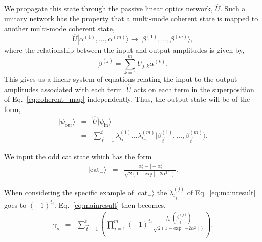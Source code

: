 \documentclass[aps,pra,singlecolumn,amsmath,amssymb,nofootinbib,superscriptaddress]{revtex4}
\newcommand{\ket}[1]{|#1\rangle}
\begin{document}
We propagate this state through the passive linear optics network, $\hat{U}$. Such a unitary network has the property that a multi-mode coherent state is mapped to another multi-mode coherent state,
\begin{equation} \label{eq:coherent_map}
\hat{U} \ket{\alpha^{(1)},\dots,\alpha^{(m)}} \to \ket{\beta^{(1)},\dots,\beta^{(m)}},
\end{equation}
where the relationship between the input and output amplitudes is given by,
\begin{equation} \label{eq:coherent_map_relation}
\beta^{(j)} = \sum_{k=1}^m U_{j,k} \alpha^{(k)}.
\end{equation}
This gives us a linear system of equations relating the input to the output amplitudes associated with each term. $\hat{U}$ acts on each term in the superposition of Eq.~\ref{eq:coherent_map} independently. Thus, the output state will be of the form,
\begin{eqnarray} \label{eq:psi_out}
\ket{\psi_\mathrm{out}} &=& \hat{U} \ket{\psi_\mathrm{in}} \nonumber \\
&=& \sum_{\vec{t}=1}^{t} \lambda_{t_1}^{(1)}\dots \lambda_{t_m}^{(m)} \ket{\beta_{\vec{t}}^{(1)}, \dots, \beta_{\vec{t}}^{(m)}}.
\end{eqnarray}

We input the odd cat state which has the form 
\begin{eqnarray}
\ket{\mathrm{cat}_-} &=& \frac{\ket{\alpha}-\ket{-\alpha}}{\sqrt{2(1-\mathrm{exp}[-2\alpha^2])}}.
\end{eqnarray}

When considering the specific example of $\ket{\mathrm{cat}_-}$ the $\lambda_{t_j}^{(j)}$ of Eq.~\ref{eq:mainresult} goes to $(-1)^{t_j}$. Eq.~\ref{eq:mainresult} then becomes,
\begin{eqnarray} \label{eq:mainresult2}
\gamma_s &=& \sum_{\vec{t}=1}^{t} \left(\prod_{j=1}^m (-1)^{t_j} \frac{f_{S_j}(\beta_{\vec{t}}^{(j)})}{\sqrt{2(1-\mathrm{exp}[-2\alpha^2])}} \right).
\end{eqnarray}
\end{document}
